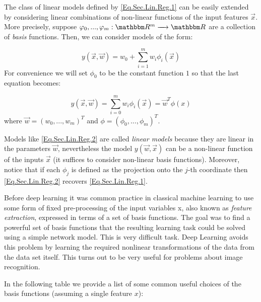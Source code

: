 The class of linear models defined by \cref{Eq.Sec.Lin.Reg.1} can be easily extended by considering linear combinations of non-linear functions of the input features $\vec{x}$. More precisely, suppose $\phi_0,...,\phi_m : \RR^m \lto \RR$ are a collection of \emph{basis} functions. Then, we can consider models of the form: 

\[ y(\vec{x},\vec{w}) = w_0 + \sum_{i=1}^{m}w_i\phi_i(\vec{x})\]
For convenience we will set $\phi_0$ to be the constant function $1$ so that the last equation becomes: 

\begin{equation}\label{Eq.Sec.Lin.Reg.2}
	y(\vec{x},\vec{w}) = \sum_{i=0}^{m}w_i\phi_i(\vec{x}) = \vec{w}^T\phi(x)
\end{equation}
where $\vec{w} = (w_0,...,w_m)^T$ and $\phi = (\phi_0,...,\phi_m)^T$.

\begin{remark}
	Models like \cref{Eq.Sec.Lin.Reg.2} are called \emph{linear models} because they are linear in the parameters $\vec{w}$, nevertheless the model $y(\vec{w},\vec{x})$ can be a non-linear function of the inputs $\vec{x}$ (it suffices to consider non-linear basis functions). Moreover, notice that if each $\phi_j$ is defined as the projection onto the $j$-th coordinate then \cref{Eq.Sec.Lin.Reg.2} recovers \cref{Eq.Sec.Lin.Reg.1}. 
\end{remark}

Before deep learning it was common practice in classical machine learning to use some form of fixed pre-processing of the input variables x, also known as \emph{feature extraction}, expressed in terms of a set of basis functions. The goal was to find a powerful set of basis functions that the resulting learning task could be solved using a simple network model. This is very difficult task. Deep Learning avoids this problem by learning the required nonlinear transformations of
the data from the data set itself. This turns out to be very useful for problems about image recognition. 

In the following table we provide a list of some common useful choices of the basis functions (assuming a single feature $x$): 

